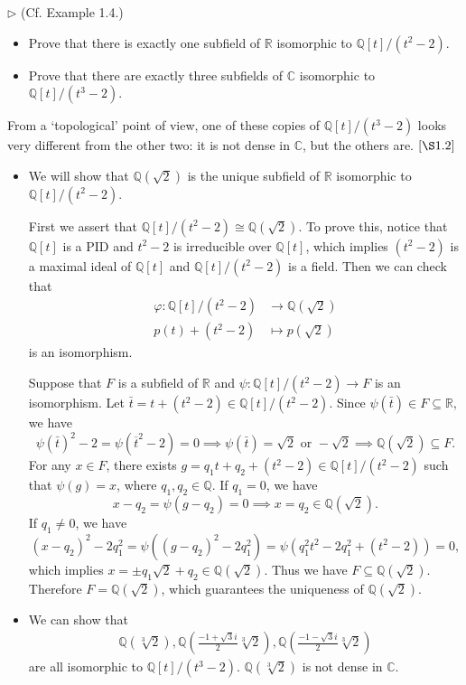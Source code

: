 \begin{problem}[1.5]
$\triangleright$ (Cf. Example 1.4.)
	\begin{itemize}
	\item Prove that there is exactly one subfield of $\mathbb{R}$ isomorphic to $\mathbb{Q}[t] /\left(t^{2}-2\right)$.
	\item  Prove that there are exactly three subfields of $\mathbb{C}$ isomorphic to $\mathbb{Q}[t] /\left(t^{3}-2\right)$.
	\end{itemize}
From a `topological' point of view, one of these copies of $\mathbb{Q}[t] /\left(t^{3}-2\right)$ looks very different from the other two: it is not dense in $\mathbb{C}$, but the others are. $[\S 1.2]$
\end{problem}
\begin{solution}
	\begin{itemize}
		\item We will show that $\mathbb{Q}(\sqrt{2})$ is the unique subfield of $\mathbb{R}$ isomorphic to $\mathbb{Q}[t] /\left(t^{2}-2\right)$. 
  
		First we assert that $\mathbb{Q}[t] /\left(t^{2}-2\right)\cong\mathbb{Q}(\sqrt{2})$. To prove this, notice that $\mathbb{Q}[t]$ is a PID and $t^2-2$ is irreducible over $\mathbb{Q}[t]$, which implies $\left(t^{2}-2\right)$ is a maximal ideal of $\mathbb{Q}[t]$ and $\mathbb{Q}[t] /\left(t^{2}-2\right)$ is a field. Then we can check that
		\begin{align*}
			\varphi:\mathbb{Q}[t] /\left(t^{2}-2\right)&\longrightarrow \mathbb{Q}(\sqrt{2}) \\
			p(t)+(t^2-2)&\longmapsto p(\sqrt{2})
		\end{align*}
		is an isomorphism.

		Suppose that $F$ is a subfield of $\mathbb{R}$ and $\psi:\mathbb{Q}[t] /\left(t^{2}-2\right)\to F$ is an isomorphism. Let $\bar{t}=t+(t^2-2)\in \mathbb{Q}[t] /\left(t^{2}-2\right)$. Since $\psi(\bar{t})\in F\subseteq\mathbb{R}$, we have
		\[
			\psi\left(\bar{t}\right)^2-2=\psi\left(\overline{t}^2-2\right)=0\implies \psi(\bar{t})=\sqrt{2}\text{ or }-\sqrt{2}\implies \mathbb{Q}(\sqrt{2})\subseteq F.
		\]
		For any $x\in F$, there exists $g=q_1t+q_2+\left(t^{2}-2\right)\in\mathbb{Q}[t] /\left(t^{2}-2\right)$ such that $\psi(g)=x$, where $q_1,q_2\in\mathbb{Q}$. If $q_1=0$, we have
		\[
			x-q_2=\psi(g-q_2)=0\implies x=q_2\in \mathbb{Q}(\sqrt{2}).
		\]
		If $q_1\ne0$, we have
		\[
			(x-q_2)^2-2q_1^2=\psi((g-q_2)^2-2q_1^2)=\psi(q_1^2t^2-2q_1^2+(t^2-2))=0,
		\]
		which implies $x=\pm q_1\sqrt{2}+q_2\in \mathbb{Q}(\sqrt{2})$. Thus we have $F\subseteq\mathbb{Q}(\sqrt{2})$. Therefore $F=\mathbb{Q}(\sqrt{2})$, which guarantees the uniqueness of $\mathbb{Q}(\sqrt{2})$.
		\item  We can show that 
		\begin{align*}
			\mathbb{Q}(\sqrt[3]{2}),\mathbb{Q}\left(\frac{-1+\sqrt{3}i}{2}\sqrt[3]{2}\right),\mathbb{Q}\left(\frac{-1-\sqrt{3}i}{2}\sqrt[3]{2}\right)
		\end{align*}
		are all isomorphic to $\mathbb{Q}[t] /\left(t^{3}-2\right)$. $\mathbb{Q}(\sqrt[3]{2})$ is not dense in $\mathbb{C}$.
	\end{itemize}
\end{solution}

